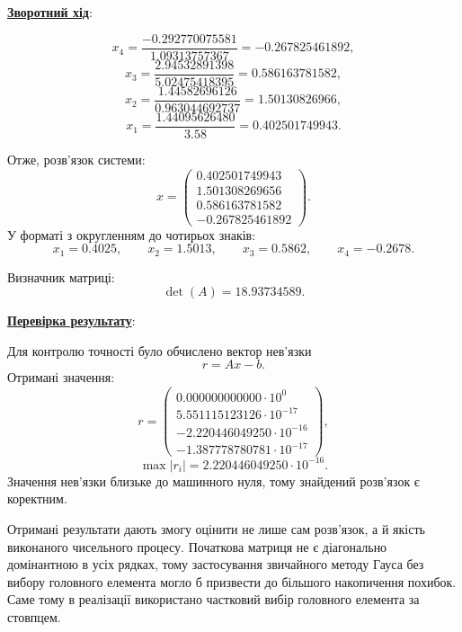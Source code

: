 \documentclass[12pt,a4paper]{article}
\begin{document}
    \vspace{1em}

    \noindent
    \textbf{\underline{Зворотний хід}}:

    \[
        x_4 = \frac{-0.292770075581}{1.09313757367}
            = -0.267825461892,
    \]
    \[
        x_3 = \frac{2.94532891398}{5.02475418395}
            = 0.586163781582,
    \]
    \[
        x_2 = \frac{1.44582696126}{0.963044692737}
            = 1.50130826966,
    \]
    \[
        x_1 = \frac{1.44095626480}{3.58}
            = 0.402501749943.
    \]

    Отже, розв'язок системи:
    \[
        x =
        \begin{pmatrix}
            0.402501749943 \\
            1.501308269656 \\
            0.586163781582 \\
            -0.267825461892
        \end{pmatrix}.
    \]
    У форматі з округленням до чотирьох знаків:
    \[
        x_1=0.4025,\qquad x_2=1.5013,\qquad x_3=0.5862,\qquad x_4=-0.2678.
    \]

    Визначник матриці:
    \[
        \det(A)=18.93734589.
    \]

    \vspace{1em}

    \noindent
    \textbf{\underline{Перевірка результату}}:

    \vspace{1em}

    Для контролю точності було обчислено вектор нев'язки
    \[
        r = Ax-b.
    \]
    Отримані значення:
    \[
        r =
        \begin{pmatrix}
            0.000000000000\cdot10^{0} \\
            5.551115123126\cdot10^{-17} \\
            -2.220446049250\cdot10^{-16} \\
            -1.387778780781\cdot10^{-17}
        \end{pmatrix},
    \]
    \[
        \max |r_i| = 2.220446049250\cdot10^{-16}.
    \]
    Значення нев'язки близьке до машинного нуля, тому знайдений розв'язок є коректним.

    \vspace{1em}

    Отримані результати дають змогу оцінити не лише сам розв'язок, а й якість виконаного
    чисельного процесу. Початкова матриця не є діагонально домінантною в усіх рядках, тому
    застосування звичайного методу Гауса без вибору головного елемента могло б призвести до
    більшого накопичення похибок. Саме тому в реалізації використано частковий вибір головного
    елемента за стовпцем.
\end{document}

